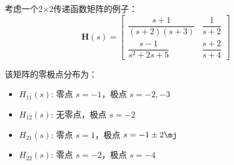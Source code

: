 考虑一个2×2传递函数矩阵的例子：
\[
    \mathbf{H}(s) = \begin{bmatrix}
        \dfrac{s+1}{(s+2)(s+3)}   & \dfrac{1}{s+2}   \\[1em]
        \dfrac{s-1}{s^2 + 2s + 5} & \dfrac{s+2}{s+4}
    \end{bmatrix}
\]

该矩阵的零极点分布为：
\begin{itemize}
    \item $H_{11}(s)$: 零点 $s = -1$，极点 $s = -2, -3$
    \item $H_{12}(s)$: 无零点，极点 $s = -2$
    \item $H_{21}(s)$: 零点 $s = 1$，极点 $s = -1 \pm 2\mj$
    \item $H_{22}(s)$: 零点 $s = -2$，极点 $s = -4$
\end{itemize}

